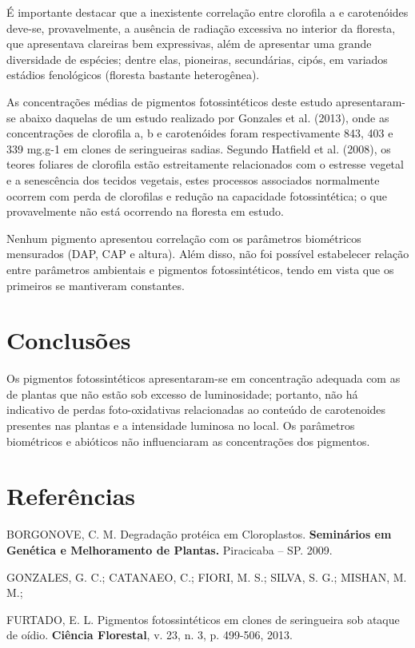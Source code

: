 \documentclass[article,12pt,onesidea,4paper,english,brazil]{abntex2}
\begin{document}
	É importante destacar que a inexistente correlação entre clorofila a e carotenóides deve-se, provavelmente, a ausência de radiação excessiva no interior da floresta, que apresentava clareiras bem expressivas, além de apresentar uma grande diversidade de espécies; dentre elas, pioneiras, secundárias, cipós, em variados estádios fenológicos (floresta bastante heterogênea).
	
	As concentrações médias de pigmentos fotossintéticos deste estudo apresentaram-se abaixo daquelas de um estudo realizado por Gonzales et al. (2013), onde as concentrações de clorofila a, b e carotenóides foram respectivamente 843, 403 e 339 mg.g-1 em clones de seringueiras sadias. Segundo Hatfield et al. (2008), os teores foliares de clorofila estão estreitamente relacionados com o estresse vegetal e a senescência dos tecidos vegetais, estes processos associados normalmente ocorrem com perda de clorofilas e redução na capacidade fotossintética; o que provavelmente não está ocorrendo na floresta em estudo.
	
	Nenhum pigmento apresentou correlação com os parâmetros biométricos mensurados (DAP, CAP e altura). Além disso, não foi possível estabelecer relação entre parâmetros ambientais e pigmentos fotossintéticos, tendo em vista que os primeiros se mantiveram constantes.
	
	\section*{Conclusões}
	
Os pigmentos fotossintéticos apresentaram-se em concentração adequada com as de plantas que não estão sob excesso de luminosidade; portanto, não há indicativo de perdas foto-oxidativas relacionadas ao conteúdo de carotenoides presentes nas plantas e a intensidade luminosa no local. Os parâmetros biométricos e abióticos não influenciaram as concentrações dos pigmentos.
	
	\sloppy
	\section*{Referências}
	
\noindent BORGONOVE, C. M. Degradação protéica em Cloroplastos. \textbf{Seminários em Genética e Melhoramento de Plantas.} Piracicaba – SP. 2009. 

\noindent GONZALES, G. C.; CATANAEO, C.; FIORI, M. S.; SILVA, S. G.; MISHAN, M. M.; 

\noindent FURTADO, E. L. Pigmentos fotossintéticos em clones de seringueira sob ataque de oídio. \textbf {Ciência Florestal}, v. 23, n. 3, p. 499-506, 2013. 
\end{document}
